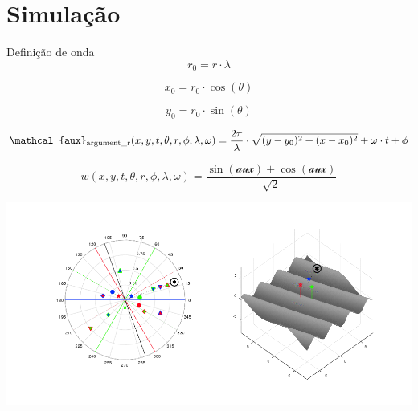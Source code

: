 \section{Simulação}
    \begin{frame}{Definição de onda}
            \begin{equation*}
                r_0 = r \cdot \lambda
            \end{equation*}

            \begin{equation*}
                x_0 = r_0 \cdot \cos(\theta)
            \end{equation*}

            \begin{equation*}
                y_0 = r_0 \cdot \sin(\theta)
            \end{equation*}

            \begin{equation*}
                \mathcal{aux}_{\text{\lstinline|argument_r|}}(x, y, t, \theta, r, \phi, \lambda, \omega) =
                \frac{2\pi}{\lambda} \cdot \sqrt{(y - y_0)^2+(x - x_0)^2} + \omega \cdot t + \phi
            \end{equation*}

            \begin{equation*}
                w(x, y, t, \theta, r, \phi, \lambda, \omega) = \frac{\sin\left(\mathcal{aux}\right)+ \cos\left(\mathcal{aux}\right)}{\sqrt{2}}
            \end{equation*}
    \end{frame}


    \begin{frame}

        \centering
        \href{https://github.com/HeckRodSav/TG/blob/main/documentation/pictures/POLY_3/simul_POLY_3_R_50.gif}{\includegraphics[width=\textwidth]{../pictures/simul_POLY_3_R_50.png}}

    \end{frame}

